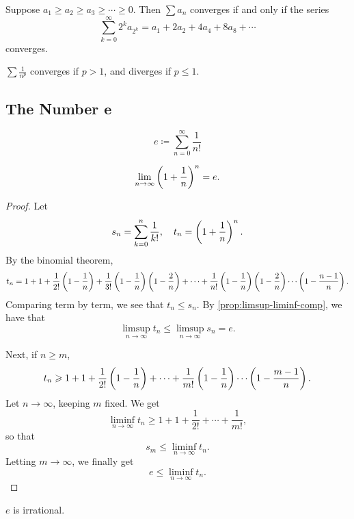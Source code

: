 \begin{lemma}
Suppose $a_1\ge a_2\ge a_3\ge\cdots\ge0$. Then $\sum a_n$ converges if and only if the series
\[\sum_{k=0}^{\infty}2^ka_{2^k}=a_1+2a_2+4a_4+8a_8+\cdots\]
converges.
\end{lemma}

\begin{lemma}[$p$-test]
$\sum\frac{1}{n^p}$ converges if $p>1$, and diverges if $p\le1$.
\end{lemma}

\subsection{The Number $\mathbf{e}$}
\begin{definition}
\[e\coloneqq\sum_{n=0}^\infty\frac{1}{n!}\]
\end{definition}

\begin{proposition}
\[\lim_{n\to\infty}\left(1+\frac{1}{n}\right)^n=e.\]
\end{proposition}

\begin{proof}
Let
\[s_n=\sum_{k=0}^n\frac{1}{k!},\quad t_n=\left(1+\frac{1}{n}\right)^n.\]
By the binomial theorem,
\[t_n=1+1+\frac{1}{2!}\left(1-\frac{1}{n}\right)+\frac{1}{3!}\left(1-\frac{1}{n}\right)\left(1-\frac{2}{n}\right)+\cdots+\frac{1}{n!}\left(1-\frac{1}{n}\right)\left(1-\frac{2}{n}\right)\cdots\left(1-\frac{n-1}{n}\right).\]
Comparing term by term, we see that $t_n\le s_n$. By \cref{prop:limsup-liminf-comp}, we have that
\[\limsup_{n\to\infty}t_n\le\limsup_{n\to\infty}s_n=e.\]

Next, if $n\ge m$,
\[t_n\geqslant1+1+\frac{1}{2!}\left(1-\frac{1}{n}\right)+\cdots+\frac{1}{m!}\left(1-\frac{1}{n}\right)\cdots\left(1-\frac{m-1}{n}\right).\]
Let $n\to\infty$, keeping $m$ fixed. We get
\[\liminf_{n\to\infty}t_n\ge1+1+\frac{1}{2!}+\cdots+\frac{1}{m!},\]
so that
\[s_m\le\liminf_{n\to\infty}t_n.\]
Letting $m\to\infty$, we finally get
\[e\le\liminf_{n\to\infty}t_n.\]

\end{proof}

\begin{proposition}
$e$ is irrational.
\end{proposition}


